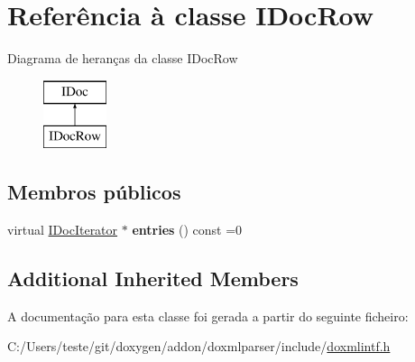\hypertarget{class_i_doc_row}{\section{Referência à classe I\-Doc\-Row}
\label{class_i_doc_row}
}
Diagrama de heranças da classe I\-Doc\-Row\begin{figure}[H]
\begin{center}
\leavevmode
\includegraphics[height=2.000000cm]{class_i_doc_row}
\end{center}
\end{figure}
\subsection*{Membros públicos}
\begin{DoxyCompactItemize}
\item 
\hypertarget{class_i_doc_row_a891aa4ad580c8eee95af66338c4d7c14}{virtual \hyperlink{class_i_doc_iterator}{I\-Doc\-Iterator} $\ast$ {\bfseries entries} () const =0}\label{class_i_doc_row_a891aa4ad580c8eee95af66338c4d7c14}

\end{DoxyCompactItemize}
\subsection*{Additional Inherited Members}


A documentação para esta classe foi gerada a partir do seguinte ficheiro\-:\begin{DoxyCompactItemize}
\item 
C\-:/\-Users/teste/git/doxygen/addon/doxmlparser/include/\hyperlink{include_2doxmlintf_8h}{doxmlintf.\-h}\end{DoxyCompactItemize}

